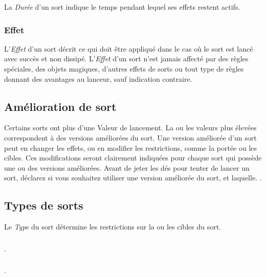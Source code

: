 La \emph{Durée} d'un sort indique le temps pendant lequel ses effets restent actifs.

\subsubsection*{Effet}

L'\emph{Effet} d'un sort décrit ce qui doit être appliqué dans le cas où le sort est lancé avec succès et non dissipé. L'\emph{Effet} d'un sort n'est jamais affecté par des règles spéciales, des objets magiques, d'autres effets de sorts ou tout type de règles donnant des avantages au lanceur, sauf indication contraire.

\subsection{Amélioration de sort}
\label{amelioration_sort}
Certains sorts ont plus d'une Valeur de lancement. La ou les valeurs plus élevées correspondent à des versions améliorées du sort. Une version améliorée d'un sort peut en changer les effets, ou en modifier les restrictions, comme la portée ou les cibles. Ces modifications seront clairement indiquées pour chaque sort qui possède une ou des versions améliorées. Avant de jeter les dés pour tenter de lancer un sort, déclarez si vous souhaitez utiliser une version améliorée du sort, et laquelle. .

\subsection{Types de sorts}

Le \emph{Type} du sort détermine les restrictions sur la ou les cibles du sort.

\subsubsection*{}

.

\subsubsection*{}

.

